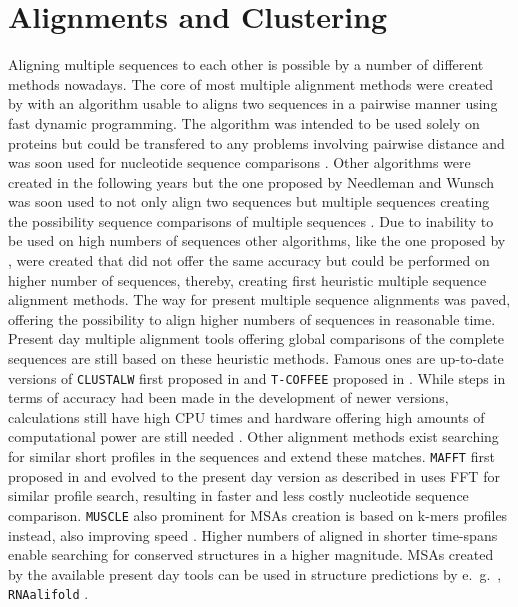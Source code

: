 \section{Alignments and Clustering}

Aligning multiple sequences to each other is possible by a number of different methods nowadays. The core of most multiple alignment methods were created by \textcite{needleman_general_1970} with an algorithm usable to aligns two sequences in a pairwise manner using fast dynamic programming. The algorithm was intended to be used solely on proteins but could be transfered to any problems involving pairwise distance and was soon used for nucleotide sequence comparisons \autocite{phillips_multiple_2000}. Other algorithms were created in the following years but the one proposed by Needleman and Wunsch was soon used to not only align two sequences but multiple sequences creating the possibility sequence comparisons of multiple sequences \autocite{phillips_multiple_2000}. Due to inability to be used on high numbers of sequences other algorithms, like the one proposed by \textcite{feng_progressive_1987}, were created that did not offer the same accuracy but could be performed on higher number of sequences, thereby, creating first heuristic multiple sequence alignment methods. The way for present multiple sequence alignments was paved, offering the possibility to align higher numbers of sequences in reasonable time. Present day multiple alignment tools offering global comparisons of the complete sequences are still based on these heuristic methods. Famous ones are up-to-date versions of \texttt{CLUSTALW} first proposed in \textcite{thompson_clustal_1994} and \texttt{T-COFFEE} proposed in \textcite{notredame_t-coffee_2000}. While steps in terms of accuracy had been made in the development of newer versions, calculations still have high CPU times and hardware offering high amounts of computational power are still needed \autocite{katoh_mafft_2002}. Other alignment methods exist searching for similar short profiles in the sequences and extend these matches. \texttt{MAFFT} first proposed in \textcite{katoh_mafft_2002} and evolved to the present day version as described in \textcite{katoh_mafft_2013} uses \gls{FFT} for similar profile search, resulting in faster and less costly nucleotide sequence comparison. \texttt{MUSCLE} also prominent for \glspl{MSA} creation is based on k-mers profiles instead, also improving speed \autocite{edgar_muscle_2004}. Higher numbers of aligned in shorter time-spans enable searching for conserved structures in a higher magnitude. \glspl{MSA} created by the available present day tools can be used in structure predictions by e.~g.~, \texttt{RNAalifold} \autocite{bernhart_rnaalifold_2008}.

